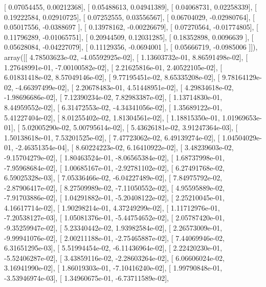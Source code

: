 \documentclass{article}
\begin{document}
       [ 0.07054455,  0.00212368],
       [ 0.05488613,  0.04941389],
       [ 0.04068731,  0.02258339],
       [ 0.19222584,  0.02910725],
       [ 0.07252555,  0.03556567],
       [ 0.06704029, -0.02980764],
       [ 0.05017556, -0.0388697 ],
       [ 0.13978162, -0.00226679],
       [ 0.07270564, -0.01774805],
       [ 0.11796289, -0.01065751],
       [ 0.20944509,  0.12031285],
       [ 0.18352898,  0.0096639 ],
       [ 0.05628084, -0.04227079],
       [ 0.11129356, -0.0694001 ],
       [ 0.05666719, -0.0985006 ]]), array([[  4.78503623e-02,  -4.05592925e-02],
       [  1.13603732e-01,   8.86591498e-02],
       [  1.27648991e-01,  -7.00100582e-02],
       [  2.21625816e-01,   2.40522105e-02],
       [  6.01831418e-02,   8.57049146e-02],
       [  9.77195451e-02,   8.65335208e-02],
       [  9.78164129e-02,  -4.66397499e-02],
       [  2.20678483e-01,   4.51448951e-02],
       [  4.29834618e-02,  -1.98696686e-02],
       [  7.12390234e-02,   7.82983387e-02],
       [  1.13714830e-01,   8.44959552e-02],
       [  6.31472553e-02,  -4.34341056e-02],
       [  1.35689122e-01,   5.41227404e-02],
       [  8.01255402e-02,   1.81304561e-02],
       [  1.18815350e-01,   1.01969653e-01],
       [  5.02005290e-02,   5.00795614e-02],
       [  5.43626181e-02,   3.91247364e-03],
       [  1.50138618e-01,   7.53201525e-02],
       [  7.47723062e-02,   6.49139274e-02],
       [  1.04504029e-01,  -2.46351354e-04],
       [  8.60224223e-02,   6.16410922e-02],
       [  3.48239603e-02,  -9.15704279e-02],
       [  1.80463524e-01,  -8.06565384e-02],
       [  1.68737998e-01,  -7.95968684e-02],
       [  1.00685167e-01,  -2.92781102e-02],
       [  6.27491768e-02,   6.59025328e-03],
       [  7.05336466e-02,  -6.04227489e-02],
       [  7.84975792e-02,  -2.87906417e-02],
       [  8.27509989e-02,  -7.11050552e-02],
       [  4.95595889e-02,  -7.91703886e-02],
       [  1.04291882e-01,  -5.20408122e-02],
       [  2.25210045e-01,   4.16617714e-02],
       [  1.90298214e-01,   4.37249299e-02],
       [  1.11712976e-01,  -7.20538127e-03],
       [  1.05081376e-01,  -5.44754652e-02],
       [  2.05787420e-01,  -9.35259947e-02],
       [  5.23340442e-02,   1.93982584e-02],
       [  2.26573009e-01,  -9.99941076e-02],
       [  2.00211188e-01,  -2.75465887e-02],
       [  7.44069946e-02,   6.31651295e-03],
       [  5.51994454e-02,  -6.11436964e-02],
       [  2.22420230e-01,  -5.52406287e-02],
       [  3.43859116e-02,  -2.28603264e-02],
       [  6.06606024e-02,   3.16941990e-02],
       [  1.86019303e-01,  -7.10416240e-02],
       [  1.99790848e-01,  -3.53946974e-03],
       [  1.34960675e-01,  -6.73711589e-02],
\end{document}
